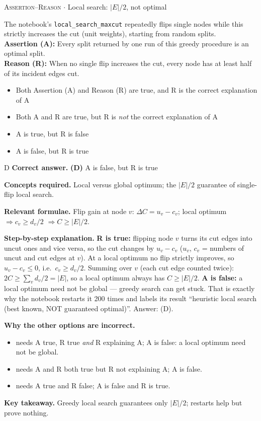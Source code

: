 \documentclass[11pt,a4paper]{article}
\newcommand{\optlabel}[1]{\textbf{(#1)}}
\newcommand{\correctlabel}[1]{\textcolor{okgreen}{\textbf{(#1)}\,\ding{51}}}
\newenvironment{qitem}[1]{\begin{list}{}{\setlength{\leftmargin}{3.3em}\setlength{\labelwidth}{3.1em}%
  \setlength{\labelsep}{0.2em}\setlength{\topsep}{3pt}\setlength{\parsep}{3pt}}\item[\textbf{Q.#1}\hfill]}{\end{list}}
\newcommand{\qsep}{\par\vspace{2pt}{\color{black!15}\hrule}\vspace{4pt}}
\newcommand{\qmeta}[2]{{\footnotesize\color{black!60}\textsc{#1} \;$\cdot$\; #2}\par}
\begin{document}
\begin{qitem}{20}
\qmeta{Assertion--Reason}{Local search: $|E|/2$, not optimal}
The notebook's \texttt{local\_search\_maxcut} repeatedly flips single nodes while this strictly increases the cut
(unit weights), starting from random splits.\\[1mm]
\textbf{Assertion (A):} Every split returned by one run of this greedy procedure is an optimal split.\\[1mm]
\textbf{Reason (R):} When no single flip increases the cut, every node has at least half of its incident edges cut.
\begin{itemize}[leftmargin=2.6em, labelsep=0.4em, itemsep=2pt, topsep=3pt]
\item[\optlabel{A}] Both Assertion (A) and Reason (R) are true, and R is the correct explanation of A
\item[\optlabel{B}] Both A and R are true, but R is \emph{not} the correct explanation of A
\item[\optlabel{C}] A is true, but R is false
\item[\correctlabel{D}] A is false, but R is true
\end{itemize}
\end{qitem}
\begin{solbox}{D}
\textbf{\color{brand}Correct answer.} \textcolor{okgreen}{\textbf{(D)}} A is false, but R is true

\textbf{\color{brand}Concepts required.} Local versus global optimum; the $|E|/2$ guarantee of single-flip local search.

\textbf{\color{brand}Relevant formulae.} Flip gain at node $v$: $\Delta C = u_v - c_v$; local optimum $\Rightarrow c_v \ge d_v/2$ $\Rightarrow C \ge |E|/2$.

\textbf{\color{brand}Step-by-step explanation.} \textbf{R is true:} flipping node $v$ turns its cut edges into uncut ones and vice versa, so the cut changes by
$u_v - c_v$ ($u_v$, $c_v$ = numbers of uncut and cut edges at $v$). At a local optimum no flip strictly improves, so
$u_v - c_v \le 0$, i.e.\ $c_v \ge d_v/2$. Summing over $v$ (each cut edge counted twice): $2C \ge \sum_v d_v/2 = |E|$, so a
local optimum always has $C \ge |E|/2$.
\textbf{A is false:} a local optimum need not be global --- greedy search can get stuck. That is exactly why the notebook
restarts it 200 times and labels its result ``heuristic local search (best known, NOT guaranteed optimal)''. Answer: (D).

\textbf{\color{brand}Why the other options are incorrect.}
\begin{itemize}[leftmargin=2.4em, itemsep=1pt, topsep=2pt]
\item[\textbf{(A)}] needs A true, R true \emph{and} R explaining A; A is false: a local optimum need not be global.
\item[\textbf{(B)}] needs A and R both true but R not explaining A; A is false.
\item[\textbf{(C)}] needs A true and R false; A is false and R is true.
\end{itemize}
\textbf{\color{brand}Key takeaway.} Greedy local search guarantees only $|E|/2$; restarts help but prove nothing.
\end{solbox}
\qsep
\end{document}
